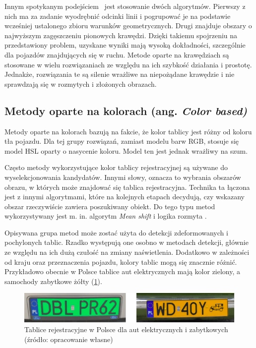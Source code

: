 Innym spotykanym podejściem~\cite{4410602} jest stosowanie dwóch algorytmów.
Pierwszy z nich ma za zadanie wyodrębnić odcinki linii i pogrupować je na podstawie wcześniej ustalonego zbioru warunków geometrycznych.
Drugi znajduje obszary o najwyższym zagęszczeniu pionowych krawędzi.
Dzięki takiemu spojrzeniu na przedstawiony problem, uzyskane wyniki mają wysoką dokładności, szczególnie dla pojazdów znajdujących się w ruchu.
Metode oparte na krawędziach są stosowane w wielu rozwiązaniach ze względu na ich szybkość działania i prostotę.
Jednakże, rozwiązania te są silenie wrażliwe na niepożądane krawędzie i nie sprawdzają się w rozmytych i złożonych obrazach.

\subsection{Metody oparte na kolorach (ang. \textit{Color based)}}
Metody oparte na kolorach bazują na fakcie, że kolor tablicy jest różny od koloru tła pojazdu.
Dla tej grupy rozwiązań, zamiast modelu barw RGB, stosuje się model HSL oparty o nasycenie koloru.
Model ten jest jednak wrażliwy na szum.

Często metody wykorzystujące kolor tablicy rejestracyjnej są używane do wyselekcjonowania kandydatów.
Innymi słowy, oznacza to wybrania obszarów obrazu, w których może znajdować się tablica rejestracyjna.
Technika ta łączona jest z innymi algorytmami, które na kolejnych etapach decydują, czy wskazany obszar rzeczywiście zawiera poszukiwany obiekt.
Do tego typu metod wykorzystywany jest m. in. algorytm \textit{Mean shift} \cite{1520110} i logika rozmyta \cite{Wang2008FuzzybasedAF}.

Opisywana grupa metod może zostać użyta do detekcji zdeformowanych i pochylonych tablic.
Rzadko występują one osobno w metodach detekcji, głównie ze względu na ich dużą czułość na zmiany naświetlenia.
Dodatkowo w zależności od kraju oraz przeznaczenia pojazdu, kolory tablic mogą się znacznie różnić.
Przykładowo obecnie w Polsce tablice aut elektrycznych mają kolor zielony, a samochody zabytkowe żółty (\ref{fig:tablice}).
\FloatBarrier
\begin{figure}[!ht]
    \centering
    \includegraphics[scale=0.6]{Pictures/tablice}
    \caption{Tablice rejestracyjne w Polsce dla aut elektrycznych i zabytkowych (źródło: opracowanie własne)}
    \label{fig:tablice}
\end{figure}
\FloatBarrier

